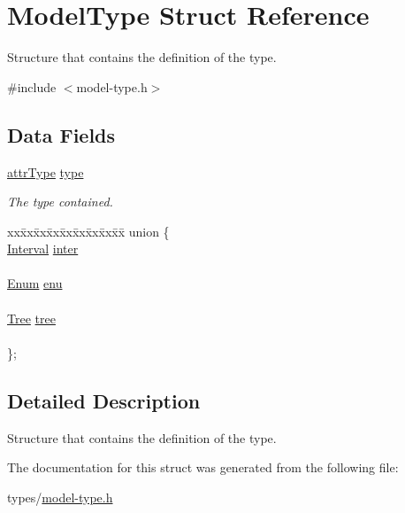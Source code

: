 \hypertarget{struct_model_type}{}\section{Model\+Type Struct Reference}
\label{struct_model_type}


Structure that contains the definition of the type.  




{\ttfamily \#include $<$model-\/type.\+h$>$}

\subsection*{Data Fields}
\begin{DoxyCompactItemize}
\item 
\hyperlink{attribute-types_8h_a1d7db01768b8c6ad96eb92c7f6a30f1b}{attr\+Type} \hyperlink{struct_model_type_a88721cff203fdfc8fcd285540041557f}{type}\hypertarget{struct_model_type_a88721cff203fdfc8fcd285540041557f}{}\label{struct_model_type_a88721cff203fdfc8fcd285540041557f}

\begin{DoxyCompactList}\small\item\em The type contained. \end{DoxyCompactList}\item 
\begin{tabbing}
xx\=xx\=xx\=xx\=xx\=xx\=xx\=xx\=xx\=\kill
union \{\\
\>\hyperlink{struct_interval}{Interval} \hyperlink{struct_model_type_ad06263baef5945b27d0454c1f4c0610c}{inter}\\
\>\\
\>\hyperlink{struct_enum}{Enum} \hyperlink{struct_model_type_a02f518c698d2fa7e1d47ea75ea1ea350}{enu}\\
\>\\
\>\hyperlink{struct_tree}{Tree} \hyperlink{struct_model_type_a96f848de88a83c2c8ca94258a9f02824}{tree}\\
\>\\
\}; \hypertarget{struct_model_type_aec4c21b88f375d3f0ce9f255ca8bfd9d}{}\label{struct_model_type_aec4c21b88f375d3f0ce9f255ca8bfd9d}
\\

\end{tabbing}\end{DoxyCompactItemize}


\subsection{Detailed Description}
Structure that contains the definition of the type. 

The documentation for this struct was generated from the following file\+:\begin{DoxyCompactItemize}
\item 
types/\hyperlink{model-type_8h}{model-\/type.\+h}\end{DoxyCompactItemize}
